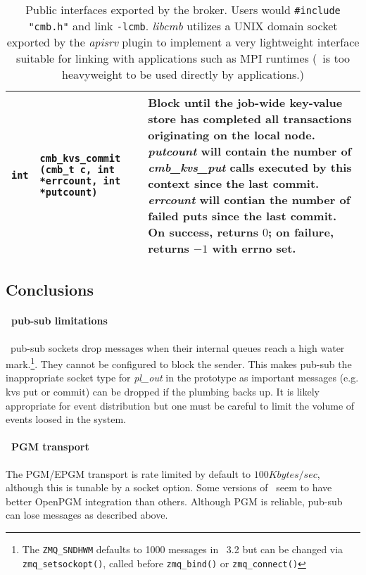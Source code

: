\begin{table}
\begin{tabular}{|p{0.7cm}p{5cm}|p{9cm}|}
{\tt int}
  & {\tt cmb\_kvs\_commit (cmb\_t c, int *errcount, int *putcount)}
  & Block until the job-wide key-value store has completed all transactions
    originating on the local node.  {\em putcount} will contain the number
    of {\em cmb\_kvs\_put} calls executed by this context since the last commit.
    {\em errcount} will contian the number of failed puts since the last commit.
    On success, returns $0$; on failure, returns $-1$ with errno set.\\
\hline
\end{tabular}
\caption{Public interfaces exported by the broker.  Users would
{\tt \#include "cmb.h"} and link {\tt -lcmb}.  {\em libcmb} utilizes
a UNIX domain socket exported by the {\em apisrv} plugin to implement
a very lightweight interface suitable for linking with applications such
as MPI runtimes (\zMQ\ is too heavyweight to be used directly by applications.)}
\label{tab:cmbapi}
\end{table}

\subsection{Conclusions}

\paragraph{\zMQ\ pub-sub limitations} \zMQ\ pub-sub sockets drop messages when
their internal queues reach a high water mark.\footnote{The {\tt ZMQ\_SNDHWM}
defaults to 1000 messages in \zMQ\ 3.2 but can be changed via
{\tt zmq\_setsockopt()}, called before {\tt zmq\_bind()} or
{\tt zmq\_connect()}}.
They cannot be configured to block the sender.  This makes pub-sub
the inappropriate socket type for {\em pl\_out} in the prototype as
important messages (e.g. kvs put or commit) can be dropped if the
plumbing backs up.
It is likely appropriate for event distribution but one must be careful
to limit the volume of events loosed in the system.

\paragraph{\zMQ\ PGM transport}  The PGM/EPGM transport is rate limited by
default to $100 Kbytes/sec$, although this is tunable by a socket option.
Some versions of \zMQ\ seem to have better OpenPGM integration than others.
Although PGM is reliable, pub-sub can lose messages as described above.

